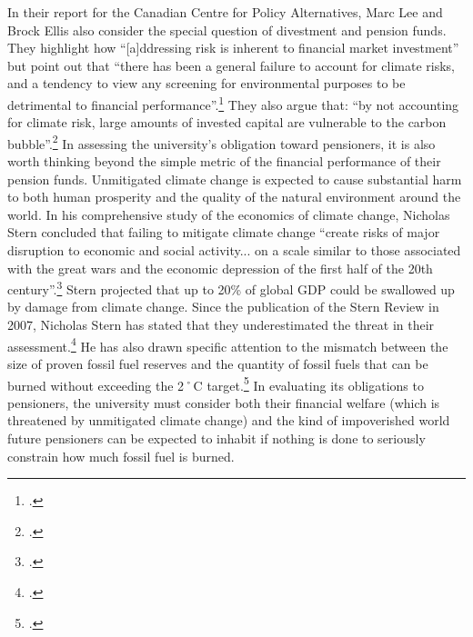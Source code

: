 In their report for the Canadian Centre for Policy Alternatives, Marc Lee and Brock Ellis also consider the special question of divestment and pension funds.
They highlight how ``[a]ddressing risk is inherent to financial market investment'' but point out that ``there has been a general failure to account for climate risks, and a tendency to view any screening for environmental purposes to be detrimental to financial performance''.\footcite[][p.8--9]{CanadaCarbonLiabilities}
They also argue that: ``by not accounting for climate risk, large amounts of invested capital are vulnerable to the carbon bubble''.\footcite[][p.9]{CanadaCarbonLiabilities}
In assessing the university's obligation toward pensioners, it is also worth thinking beyond the simple metric of the financial performance of their pension funds.
Unmitigated climate change is expected to cause substantial harm to both human prosperity and the quality of the natural environment around the world.
In his comprehensive study of the economics of climate change, Nicholas Stern concluded that failing to mitigate climate change ``create risks of major disruption to economic and social activity... on a scale similar to those associated with the great wars and the economic depression of the first half of the 20th century''.\footcite[][See also: \url{http://www.hm-treasury.gov.uk/d/Executive_Summary.pdf}]{Stern2007}
Stern projected that up to 20\% of global GDP could be swallowed up by damage from climate change.
Since the publication of the Stern Review in 2007, Nicholas Stern has stated that they underestimated the threat in their assessment.\footcite{Stern2008}
He has also drawn specific attention to the mismatch between the size of proven fossil fuel reserves and the quantity of fossil fuels that can be burned without exceeding the 2˚C target.\footcite[][]{FTOvervalued}
In evaluating its obligations to pensioners, the university must consider both their financial welfare (which is threatened by unmitigated climate change) and the kind of impoverished world future pensioners can be expected to inhabit if nothing is done to seriously constrain how much fossil fuel is burned.



